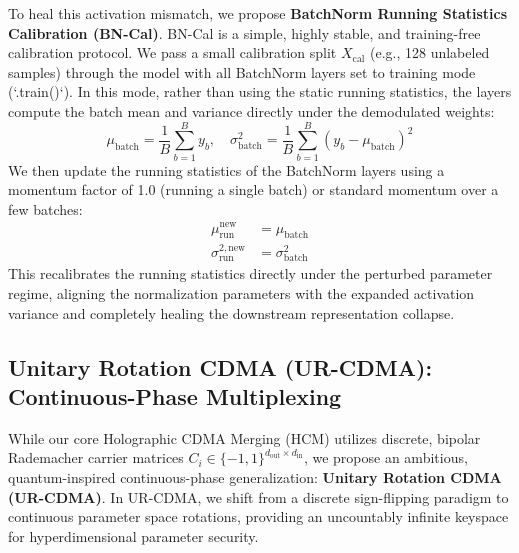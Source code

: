 \documentclass{article}
\begin{document}
To heal this activation mismatch, we propose \textbf{BatchNorm Running Statistics Calibration (BN-Cal)}. BN-Cal is a simple, highly stable, and training-free calibration protocol. We pass a small calibration split $X_{\text{cal}}$ (e.g., 128 unlabeled samples) through the model with all BatchNorm layers set to training mode (`.train()`). In this mode, rather than using the static running statistics, the layers compute the batch mean and variance directly under the demodulated weights:
\begin{equation}
    \mu_{\text{batch}} = \frac{1}{B} \sum_{b=1}^B y_b, \quad \sigma^2_{\text{batch}} = \frac{1}{B} \sum_{b=1}^B (y_b - \mu_{\text{batch}})^2
\end{equation}
We then update the running statistics of the BatchNorm layers using a momentum factor of 1.0 (running a single batch) or standard momentum over a few batches:
\begin{align}
    \mu_{\text{run}}^{\text{new}} &= \mu_{\text{batch}} \\
    \sigma^{2, \text{new}}_{\text{run}} &= \sigma^2_{\text{batch}}
\end{align}
This recalibrates the running statistics directly under the perturbed parameter regime, aligning the normalization parameters with the expanded activation variance and completely healing the downstream representation collapse.

\subsection{Unitary Rotation CDMA (UR-CDMA): Continuous-Phase Multiplexing}
\label{sec:ur_cdma}
While our core Holographic CDMA Merging (HCM) utilizes discrete, bipolar Rademacher carrier matrices $C_i \in \{-1, 1\}^{d_{\text{out}} \times d_{\text{in}}}$, we propose an ambitious, quantum-inspired continuous-phase generalization: \textbf{Unitary Rotation CDMA (UR-CDMA)}. In UR-CDMA, we shift from a discrete sign-flipping paradigm to continuous parameter space rotations, providing an uncountably infinite keyspace for hyperdimensional parameter security.
\end{document}
